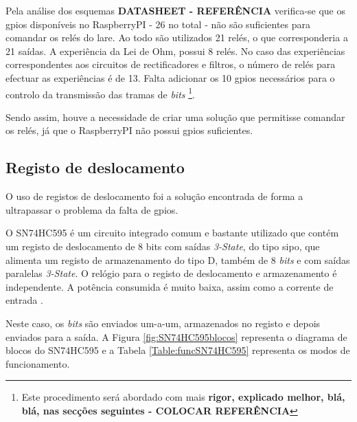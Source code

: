 Pela análise dos esquemas \textbf{DATASHEET - REFERÊNCIA} verifica-se que os \acrshort{gpio}s disponíveis no \gls{RaspberryPI} - 26 no total - não são suficientes para comandar os relés do \acrshort{lare}. Ao todo são utilizados 21 relés, o que corresponderia a 21 saídas. A experiência da Lei de Ohm, possui 8 relés. No caso das experiências correspondentes aos circuitos de rectificadores e filtros, o número de relés para efectuar as experiências é de 13. Falta adicionar os 10 \acrshort{gpio}s necessários para o controlo da transmissão das tramas de \textit{bits} \footnote{Este procedimento será abordado com mais \textbf{rigor, explicado melhor, blá, blá, nas secções seguintes - COLOCAR REFERÊNCIA}}.

Sendo assim, houve a necessidade de criar uma solução que permitisse comandar os relés, já que o \gls{RaspberryPI} não possui \acrshort{gpio}s suficientes.

\subsection{Registo de deslocamento}
\label{sec:registodeslocamento}
O uso de registos de deslocamento foi a solução encontrada de forma a ultrapassar o problema da falta de \acrshort{gpio}s.

O SN74HC595 é um circuito integrado comum e bastante utilizado que contém um registo de deslocamento de 8 bits com saídas \textit{3-State}, do tipo \acrfull{sipo}, que alimenta um registo de armazenamento do tipo D, também de 8 \textit{bits} e com saídas paralelas \textit{3-State}. O relógio para o registo de deslocamento e armazenamento é independente. A potência consumida é muito baixa, assim como a corrente de entrada \cite{SN74HC595}.

Neste caso, os \textit{bits} são enviados um-a-um, armazenados no registo e depois enviados para a saída. A Figura \ref{fig:SN74HC595blocos} representa o diagrama de blocos do SN74HC595 e a Tabela \ref{Table:funcSN74HC595} representa os modos de funcionamento.

